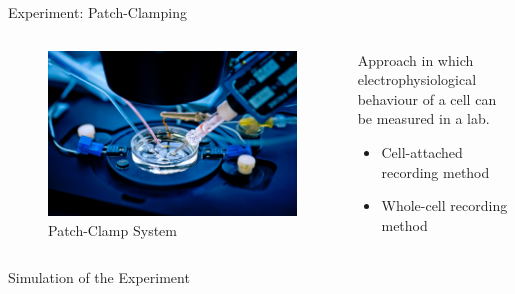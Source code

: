 \documentclass[aspectratio=169, hyperref={colorlinks=true}]{beamer}
\begin{document}
  \begin{frame}{Experiment: Patch-Clamping}
    \begin{columns}
      \begin{column}{0.4\linewidth}
        \begin{figure}
          \includegraphics[width=\linewidth]{../../figures/patch-clamp-system.jpeg}
          \caption{Patch-Clamp System \cite{2025-patch-clamp-image}}
        \end{figure}
      \end{column}
      \begin{column}{0.58\linewidth}
        Approach in which electrophysiological behaviour of a cell can be measured in a lab.
        \begin{itemize}
          \item Cell-attached recording method
          \item Whole-cell recording method
        \end{itemize}
      \end{column}
    \end{columns}
  \end{frame}

  \begin{frame}{Simulation of the Experiment}
  \end{frame}
\end{document}
